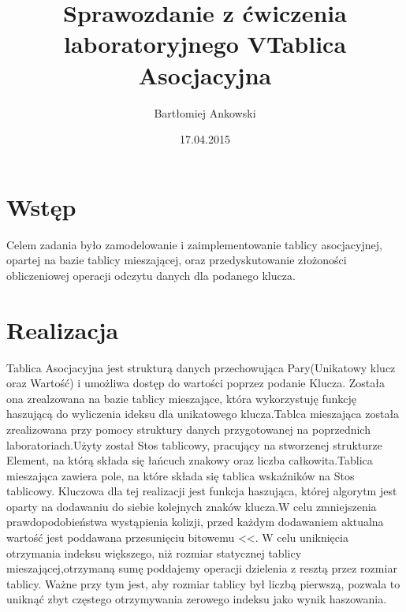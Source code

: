 \documentclass[12pt,a4paper,titlepage]{article}
\title{Sprawozdanie z ćwiczenia laboratoryjnego V\newline Tablica Asocjacyjna}
\date{17.04.2015}
\author{Bartłomiej Ankowski}
\begin{document}
\maketitle
\pagestyle{empty}
\tableofcontents
\section{Wstęp}
Celem zadania było zamodelowanie i zaimplementowanie tablicy asocjacyjnej, opartej na bazie tablicy
mieszającej, oraz przedyskutowanie złożoności obliczeniowej operacji odczytu danych dla podanego klucza.
\section{Realizacja}
Tablica Asocjacyjna jest strukturą danych przechowująca Pary(Unikatowy klucz oraz Wartość) i umożliwa dostęp do wartości poprzez podanie Klucza.
Została ona zrealzowana na bazie tablicy mieszające, która wykorzystuję funkcję haszującą do wyliczenia
ideksu dla unikatowego klucza.Tablca mieszająca została zrealizowana przy pomocy struktury danych przygotowanej na poprzednich laboratoriach.Użyty został Stos tablicowy, pracujący na stworzenej strukturze Element, na którą składa się łańcuch znakowy oraz liczba całkowita.Tablica mieszająca zawiera pole, na które składa się tablica wskaźników na Stos tablicowy.
Kluczowa dla tej realizacji jest funkcja haszująca, której algorytm jest oparty na dodawaniu do siebie kolejnych znaków klucza.W celu zmniejszenia prawdopodobieństwa wystąpienia kolizji, przed każdym dodawaniem
aktualna wartość jest poddawana przesunięciu bitowemu <<.
W celu uniknięcia otrzymania indeksu większego, niż rozmiar statycznej tablicy mieszającej,otrzymaną sumę 
poddajemy operacji dzielenia z resztą przez rozmiar tablicy. Ważne przy tym jest, aby rozmiar tablicy był liczbą pierwszą, pozwala to uniknąć zbyt częstego otrzymywania zerowego indeksu jako wynik haszowania.
\end{document}
